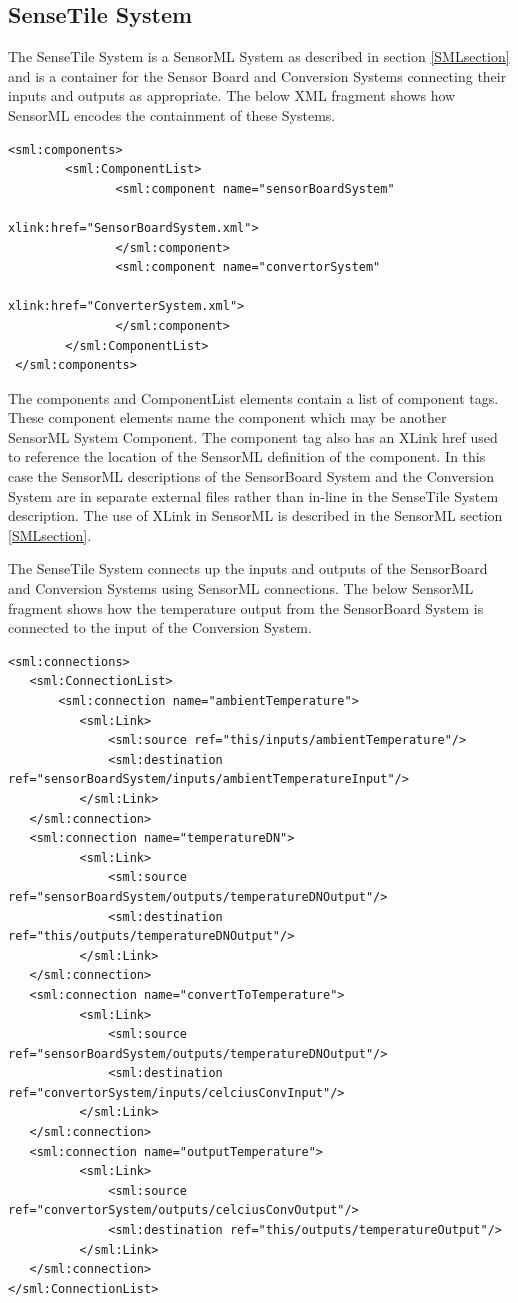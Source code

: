 \documentclass[]{final_report}
\begin{document}
\subsection{SenseTile System}
The SenseTile System is a SensorML System as described in section \ref{SMLsection} and is a container for the Sensor Board and Conversion Systems connecting their inputs and outputs as appropriate. The below XML fragment shows how SensorML encodes the containment of these Systems. 
\lstset{language=XML,basicstyle=\scriptsize,frame=single}
\begin{lstlisting}
<sml:components>
        <sml:ComponentList>
               <sml:component name="sensorBoardSystem" 
                                          xlink:href="SensorBoardSystem.xml">
               </sml:component>
               <sml:component name="convertorSystem"  
                                          xlink:href="ConverterSystem.xml">
               </sml:component>
        </sml:ComponentList>			   
 </sml:components>
\end{lstlisting}
The components and ComponentList elements contain a list of component tags. These component elements name the component which may be another SensorML System  Component. The component tag also has an XLink href used to reference the location of the SensorML definition of the component.  In this case the SensorML descriptions of the SensorBoard System and the Conversion System are in separate external files rather than in-line in the SenseTile System description. The use of XLink in SensorML is described in the SensorML section \ref{SMLsection}.

The SenseTile System connects up the inputs and outputs of the SensorBoard and Conversion Systems using SensorML connections. The below SensorML fragment shows how the temperature output from the SensorBoard System is connected to the input of the Conversion System.

\begin{lstlisting}
<sml:connections>
   <sml:ConnectionList>
       <sml:connection name="ambientTemperature">
          <sml:Link>
              <sml:source ref="this/inputs/ambientTemperature"/>
              <sml:destination ref="sensorBoardSystem/inputs/ambientTemperatureInput"/>
          </sml:Link>
   </sml:connection>
   <sml:connection name="temperatureDN">
          <sml:Link>
              <sml:source ref="sensorBoardSystem/outputs/temperatureDNOutput"/>
              <sml:destination ref="this/outputs/temperatureDNOutput"/>
          </sml:Link>
   </sml:connection>
   <sml:connection name="convertToTemperature">
          <sml:Link>
              <sml:source ref="sensorBoardSystem/outputs/temperatureDNOutput"/>
              <sml:destination ref="convertorSystem/inputs/celciusConvInput"/>
          </sml:Link>
   </sml:connection>
   <sml:connection name="outputTemperature">
          <sml:Link>
              <sml:source ref="convertorSystem/outputs/celciusConvOutput"/>
              <sml:destination ref="this/outputs/temperatureOutput"/>
          </sml:Link>
   </sml:connection>
</sml:ConnectionList>
\end{lstlisting}
\end{document}
